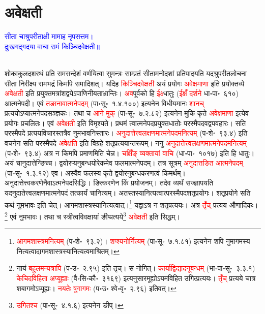 \section[अवेक्षती]{अवेक्षती}
\label{sec:aveksati}
\centering\textcolor{blue}{सीता चाश्रुपरीताक्षी मामाह नृपसत्तम।\nopagebreak\\
दुःखगद्गदया वाचा रामं किञ्चिदवेक्षती॥}\nopagebreak\\
\\
\begin{sloppypar}\justifying\noindent\hspace{10mm} शोकाकुल\-दशरथं प्रति राम\-सन्देशं वर्णयित्वा सुमन्त्रः साम्प्रतं सीता\-मनोदशां प्रतिपादयति यदश्रु\-परीत\-लोचना सीता निरीक्ष्य राम\-भद्रं किमपि समादिशत्। यदिह \textcolor{red}{किञ्चिदवेक्षती} अयं प्रयोगः \textcolor{red}{अवेक्षमाणा} इति प्रयोक्तव्ये \textcolor{red}{अवेक्षती} इति
प्रयुक्तमत्रांश\-द्वयेऽपाणिनीयता\-भ्रान्तिः।
\textcolor{red}{अव}पूर्वको हि \textcolor{red}{ईक्ष्}धातुः (\textcolor{red}{ईक्षँ दर्शने} धा॰पा॰~६१०) आत्मनेपदी। एवं \textcolor{red}{तङानावात्मनेपदम्} (पा॰सू॰~१.४.१००) इत्यनेन विधीयमानः \textcolor{red}{शानच्} प्रत्ययोऽप्यात्मनेपद\-सञ्ज्ञकः। तथा च \textcolor{red}{आने मुक्} (पा॰सू॰~७.२.८२) इत्यनेन मुकि कृते \textcolor{red}{अवेक्षमाणा} इत्येव प्रयोगः प्रचलितः। एवं \textcolor{red}{अवेक्षती} इति विमृश्यते। प्रथमं त्वात्मनेपद\-प्रयुक्त\-धातोः परस्मैपदवद्व्यवहारः। सति परस्मैपदे प्रत्यय\-विचारस्तत्रैव नुमभाव\-निस्तारः। \textcolor{red}{अनुदात्तेत्त्व\-लक्षणमात्मने\-पदमनित्यम्} (प॰शे॰~९३.४) इति वचनेन सति परस्मैपदे \textcolor{red}{अवेक्षति} इति विग्रहे शतृ\-प्रत्ययान्त\-रूपम्। ननु \textcolor{red}{अनुदात्तेत्त्व\-लक्षणमात्मने\-पदमनित्यम्} (प॰शे॰~९३.४) अत्र न किमपि प्रमाणमिति चेन्न। \textcolor{red}{चक्षिँङ् व्यक्तायां वाचि} (धा॰पा॰~१०१७) इति हि धातुः। अयं चानुदात्तेन्ङिच्च। द्वयोरप्यनुबन्धयोरेकमेव फलमात्मनेपदम्। तत्र सूत्रम् \textcolor{red}{अनुदात्तङित आत्मनेपदम्} (पा॰सू॰~१.३.१२) एव। अस्यैव फलस्य कृते द्वयोरनुबन्ध\-करणत्वं किमर्थम्। अनुदात्तेत्त्व\-करणेनैवाऽत्मनेपद\-सिद्धिः। ङित्करणेन किं प्रयोजनम्। तदेव व्यर्थं सज्ज्ञापयति यदनुदातेत्त्व\-लक्षणमात्मनेपदं तत्कार्यं चानित्यम्। अतस्तस्यानित्यत्वात्परस्मैपद\-शतृ\-प्रयोगः। शतृ\-प्रयोगे सति कथं नुमभावः इति चेत्। आगम\-शास्त्रस्यानित्यत्वात्।\footnote{\textcolor{red}{आगम\-शास्त्रमनित्यम्} (प॰शे॰~९३.२)। \textcolor{red}{शप्श्यनोर्नित्यम्} (पा॰सू॰~७.१.८१) इत्यनेन शपि नुमागमस्य नित्यत्वादागम\-शास्त्रस्यानित्यत्वमाश्रितम्।} यद्वाऽत्र न शतृ\-प्रत्ययः। अत्र \textcolor{red}{तृँच्} प्रत्यय औणादिकः।\footnote{नायं \textcolor{red}{बहुलमन्यत्रापि} (प॰उ॰~२.९५) इति तृच्। स नोगित्। \textcolor{red}{कार्याद्विद्यादनूबन्धम्} (भा॰पा॰सू॰~३.३.१) \textcolor{red}{केचिदविहिता अप्यूह्याः} (वै॰सि॰कौ॰~३१६९) इत्यनुसारमूह्योऽ\-यमविहित उगित्प्रत्ययः। \textcolor{red}{तृँच्} प्रत्यये चात्र शबागमोऽप्यूह्यः। \textcolor{red}{नयतेः षुगागमः} (प॰उ॰ श्वे॰वृ॰~२.९६) इतिवत्।}
एवं नुमभावः। तथा च स्त्रीत्व\-विवक्षायां ङीप्प्रत्यये\footnote{\textcolor{red}{उगितश्च} (पा॰सू॰~४.१.६) इत्यनेन ङीप्।} \textcolor{red}{अवेक्षती} इति सिद्धम्।\end{sloppypar}
